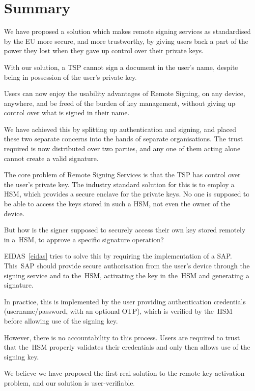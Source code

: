 \chapter*{Summary}
We have proposed a solution which makes remote signing services as standardised by the \gls{EU} more secure,
and more trustworthy,
by giving users back a part of the power they lost when they gave up control over their private keys.

With our solution,
a \gls{TSP} cannot sign a document in the user's name,
despite being in possession of the user's private key.

Users can now enjoy the usability advantages of Remote Signing,
on any device, anywhere,
and be freed of the burden of key management,
without giving up control over what is signed in their name.

We have achieved this by splitting up authentication and signing,
and placed these two separate concerns into the hands of separate organisations.
The trust required is now distributed over two parties,
and any one of them acting alone cannot create a valid signature.

The core problem of Remote Signing Services is that the \gls{TSP} has control over the user's private key.
The industry standard solution for this is to employ a \gls{HSM},
which provides a secure enclave for the private keys.
No one is supposed to be able to access the keys stored in such a \gls{HSM},
not even the owner of the device.

But how is the signer supposed to securely access their own key stored remotely in a~\gls{HSM},
to approve a specific signature operation?

EIDAS~\ref{eidas} tries to solve this by requiring the implementation of a \gls{SAP}.
This~\gls{SAP} should provide secure authorisation from the user's device through the signing service and to the~\gls{HSM},
activating the key in the~\gls{HSM} and generating a signature.

In practice,
this is implemented by the user providing authentication credentials (username/password, with an optional \gls{OTP}),
which is verified by the~\gls{HSM} before allowing use of the signing key.

However, there is no accountability to this process.
Users are required to trust that the~\gls{HSM} properly validates their credentials and only then
allows use of the signing key.

We believe we have proposed the first real solution to the remote key activation problem,
and our solution is user-verifiable.

